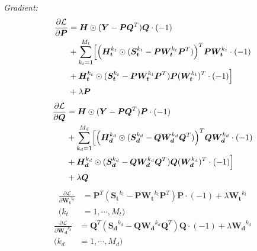 \documentclass{article}
\begin{document}
\textit{Gradient:}
\begin{equation} %
\begin{split}
\frac {\partial \mathcal{L}}{\partial \bm{P}} &=\bm{H}\odot(\bm{Y}-\bm{P}\bm{Q}^T)\bm{Q}\cdot(-1)\\
&+ \sum_{k_t=1}^{M_t} \Bigl[ \Bigl( \bm{H_t}^{k_t}\odot(\bm{S_t}^{k_t}-\bm{P}\bm{W_t}^{k_t}\bm{P}^T )\Bigr)^T\bm{P}\bm{W_t}^{k_t}\cdot(-1)\\
&+ \bm{H_t}^{k_t}\odot(\bm{S_t}^{k_t}-\bm{P}\bm{W_t}^{k_t}\bm{P}^T)\bm{P}(\bm{W_t}^{k_t})^T\cdot(-1) \Bigr]\\
&+ \lambda \bm{P}\\
\end{split}
\end{equation}
\begin{equation} %
\begin{split}
\frac {\partial \mathcal{L}}{\partial \bm{Q}} &=\bm{H}\odot(\bm{Y}-\bm{P}\bm{Q}^T)\bm{P}\cdot(-1)\\
&+ \sum_{k_d=1}^{M_d} \Bigl[ \Bigl( \bm{H_d}^{k_d}\odot( \bm{S_d}^{k_d}-\bm{Q}\bm{W_d}^{k_d}\bm{Q}^T )\Bigr)^T\bm{Q}\bm{W_d}^{k_d}\cdot(-1)\\
&+ \bm{H_d}^{k_d}\odot(\bm{S_d}^{k_d}-\bm{Q}\bm{W_d}^{k_d}\bm{Q}^T)\bm{Q}(\bm{W_d}^{k_d})^T\cdot(-1) \Bigr]\\
&+ \lambda \bm{Q}\\
\end{split}
\end{equation}
\begin{equation} %
\begin{split}
\frac {\partial \mathcal{L}}{\partial \bm{W_t}^{k_t}} &=\bm{P}^T(\bm{S_t}^{k_t}-\bm{P}\bm{W_t}^{k_t}\bm{P}^T)\bm{P}\cdot(-1)+\lambda \bm{W_t}^{k_t}\\
 (k_t &= 1,\cdots,M_t)
\end{split}
\end{equation}
\begin{equation} %
\begin{split}
\frac {\partial \mathcal{L}}{\partial \bm{W_d}^{k_d}} &=\bm{Q}^T(\bm{S_d}^{k_d}-\bm{Q}\bm{W_d}^{k_d}\bm{Q}^T)\bm{Q}\cdot(-1)+\lambda \bm{W_d}^{k_d}\\
 (k_d &= 1,\cdots,M_d)
\end{split}
\end{equation}
\end{document}
